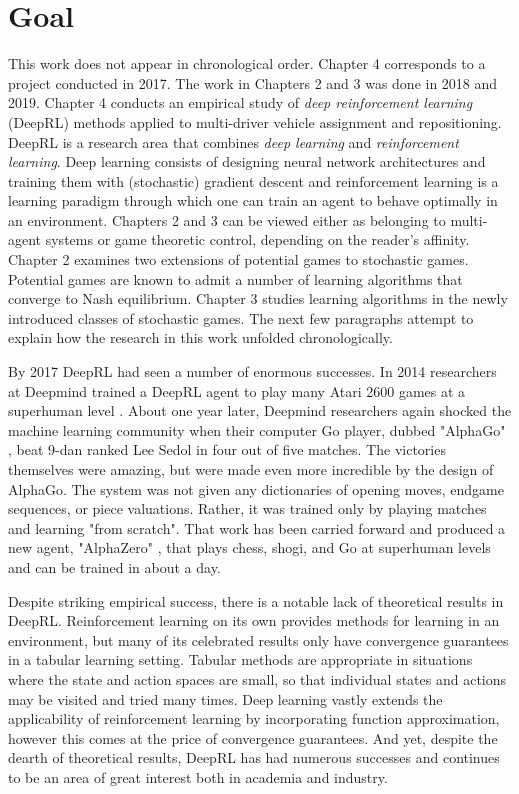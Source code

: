 \section{Goal}
\label{sec:goal}

This work does not appear in chronological order. Chapter 4 corresponds to a project conducted in 2017. The work in Chapters 2 and 3 was done in 2018 and 2019. Chapter 4 conducts an empirical study of {\em deep reinforcement learning} (DeepRL) methods applied to multi-driver vehicle assignment and repositioning. DeepRL is a research area that combines {\em deep learning} and {\em reinforcement learning}. Deep learning consists of designing neural network architectures and training them with (stochastic) gradient descent and reinforcement learning is a learning paradigm through which one can train an agent to behave optimally in an environment. Chapters 2 and 3 can be viewed either as belonging to multi-agent systems or game theoretic control, depending on the reader's affinity. Chapter 2 examines two extensions of potential games to stochastic games. Potential games are known to admit a number of learning algorithms that converge to Nash equilibrium. Chapter 3 studies learning algorithms in the newly introduced classes of stochastic games. The next few paragraphs attempt to explain how the research in this work unfolded chronologically.

By 2017 DeepRL had seen a number of enormous successes. In 2014 researchers at Deepmind trained a DeepRL agent to play many Atari 2600 games at a superhuman level \cite{mnih2015human}. About one year later, Deepmind researchers again shocked the machine learning community when their computer Go player, dubbed "AlphaGo" \cite{silver2016mastering}, beat 9-dan ranked Lee Sedol in four out of five matches. The victories themselves were amazing, but were made even more incredible by the design of AlphaGo. The system was not given any dictionaries of opening moves, endgame sequences, or piece valuations. Rather, it was trained only by playing matches and learning "from scratch". That work has been carried forward and produced a new agent, "AlphaZero" \cite{alphazero}, that plays chess, shogi, and Go at superhuman levels and can be trained in about a day.

Despite striking empirical success, there is a notable lack of theoretical results in DeepRL. Reinforcement learning on its own provides methods for learning in an environment, but many of its celebrated results only have convergence guarantees in a tabular learning setting. Tabular methods are appropriate in situations where the state and action spaces are small, so that individual states and actions may be visited and tried many times. Deep learning vastly extends the applicability of reinforcement learning by incorporating function approximation, however this comes at the price of convergence guarantees. And yet, despite the dearth of theoretical results, DeepRL has had numerous successes and continues to be an area of great interest both in academia and industry.

